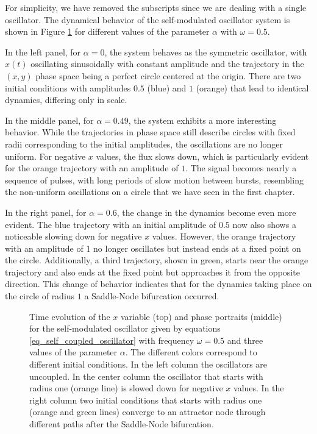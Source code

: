 \documentclass{article}
\begin{document}
For simplicity, we have removed the subscripts since we are dealing with a single oscillator.
The dynamical behavior of the self-modulated oscillator system is shown in Figure \ref{fig_selfmod} for different values of the parameter $\alpha$ with $\omega = 0.5$. 

In the left panel, for $\alpha = 0$, the system behaves as the symmetric oscillator, with $x(t)$ oscillating sinusoidally with constant amplitude and the trajectory in the $(x, y)$ phase space being a perfect circle centered at the origin. 
There are two initial conditions with amplitudes $0.5$ (blue) and $1$ (orange) that lead to identical dynamics, differing only in scale.

In the middle panel, for $\alpha = 0.49$, the system exhibits a more interesting behavior. 
While the trajectories in phase space still describe circles with fixed radii corresponding to the initial amplitudes, the oscillations are no longer uniform. For negative $x$ values, the flux slows down, which is particularly evident for the orange trajectory with an amplitude of $1$. 
The signal becomes nearly a sequence of pulses, with long periods of slow motion between bursts, resembling the non-uniform oscillations on a circle that we have seen in the first chapter. 

In the right panel, for $\alpha = 0.6$, the change in the dynamics become even more evident. 
The blue trajectory with an initial amplitude of $0.5$ now also shows a noticeable slowing down for negative $x$ values. 
However, the orange trajectory with an amplitude of $1$ no longer oscillates but instead ends at a fixed point on the circle. 
Additionally, a third trajectory, shown in green, starts near the orange trajectory and also ends at the fixed point but approaches it from the opposite direction. 
This change of behavior indicates that for the dynamics taking place on the circle of radius $1$ a Saddle-Node bifurcation occurred.

\begin{figure} [h]
    \centerline{}
    \caption{Time evolution of the $x$ variable (top) and phase portraits (middle) for the self-modulated oscillator given by equations \ref{eq_self_coupled_oscillator} with frequency $\omega=0.5$ and three values of the parameter $\alpha$. 
    The different colors correspond to different initial conditions. In the left column the oscillators are uncoupled. In the center column the oscillator that starts with radius one (orange line) is slowed down for negative $x$ values. In the right column two initial conditions that starts with radius one (orange and green lines) converge to an attractor node through different paths after the Saddle-Node bifurcation.
    }
    \label{fig_selfmod}
\end{figure}
\end{document}
